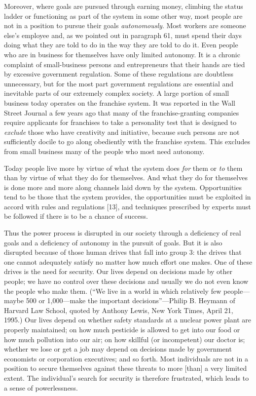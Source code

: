  Moreover, where goals are pursued through earning money, climbing the status ladder or functioning as part of the system in some other way, most people are not in a position to pursue their goals {\em autonomously}. Most workers are someone else’s employee and, as we pointed out in paragraph 61, must spend their days doing what they are told to do in the way they are told to do it. Even people who are in business for themselves have only limited autonomy. It is a chronic complaint of small-business persons and entrepreneurs that their hands are tied by excessive government regulation. Some of these regulations are doubtless unnecessary, but for the most part government regulations are essential and inevitable parts of our extremely complex society. A large portion of small business today operates on the franchise system. It was reported in the Wall Street Journal a few years ago that many of the franchise-granting companies require applicants for franchises to take a personality test that is designed to {\em exclude} those who have creativity and initiative, because such persons are not sufficiently docile to go along obediently with the franchise system. This excludes from small business many of the people who most need autonomy.

 Today people live more by virtue of what the system does {\em for} them or {\em to} them than by virtue of what they do for themselves. And what they do for themselves is done more and more along channels laid down by the system. Opportunities tend to be those that the system provides, the opportunities must be exploited in accord with rules and regulations [13], and techniques prescribed by experts must be followed if there is to be a chance of success.

 Thus the power process is disrupted in our society through a deficiency of real goals and a deficiency of autonomy in the pursuit of goals. But it is also disrupted because of those human drives that fall into group 3: the drives that one cannot adequately satisfy no matter how much effort one makes. One of these drives is the need for security. Our lives depend on decisions made by other people; we have no control over these decisions and usually we do not even know the people who make them. (“We live in a world in which relatively few people—maybe 500 or 1,000—make the important decisions”—Philip B. Heymann of Harvard Law School, quoted by Anthony Lewis, New York Times, April 21, 1995.) Our lives depend on whether safety standards at a nuclear power plant are properly maintained; on how much pesticide is allowed to get into our food or how much pollution into our air; on how skillful (or incompetent) our doctor is; whether we lose or get a job may depend on decisions made by government economists or corporation executives; and so forth. Most individuals are not in a position to secure themselves against these threats to more [than] a very limited extent. The individual’s search for security is therefore frustrated, which leads to a sense of powerlessness.

